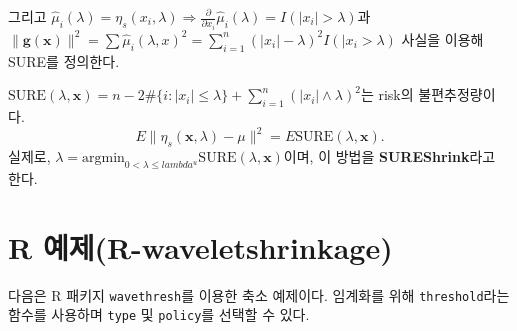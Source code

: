 \documentclass[b5paper,]{scrbook}
\makeatletter
\newenvironment{Shaded}{\begin{snugshade}}{\end{snugshade}}
\newcommand{\DataTypeTok}[1]{\textcolor[rgb]{0.13,0.29,0.53}{#1}}
\newcommand{\DecValTok}[1]{\textcolor[rgb]{0.00,0.00,0.81}{#1}}
\newcommand{\FloatTok}[1]{\textcolor[rgb]{0.00,0.00,0.81}{#1}}
\newcommand{\KeywordTok}[1]{\textcolor[rgb]{0.13,0.29,0.53}{\textbf{#1}}}
\newcommand{\NormalTok}[1]{#1}
\newcommand{\OperatorTok}[1]{\textcolor[rgb]{0.81,0.36,0.00}{\textbf{#1}}}
\newcommand{\StringTok}[1]{\textcolor[rgb]{0.31,0.60,0.02}{#1}}
\theoremstyle{plain}
\theoremstyle{definition}
\numberwithin{equation}{section}
\newenvironment{kframe}{%
\medskip{}
\setlength{\fboxsep}{.8em}
 \def\at@end@of@kframe{}%
 \ifinner\ifhmode%
  \def\at@end@of@kframe{\end{minipage}}%
  \begin{minipage}{\columnwidth}%
 \fi\fi%
 \def\FrameCommand##1{\hskip\@totalleftmargin \hskip-\fboxsep
 \colorbox{shadecolor}{##1}\hskip-\fboxsep
     \hskip-\linewidth \hskip-\@totalleftmargin \hskip\columnwidth}%
 \MakeFramed {\advance\hsize-\width
   \@totalleftmargin\z@ \linewidth\hsize
   \@setminipage}}%
 {\par\unskip\endMakeFramed%
 \at@end@of@kframe}
\renewenvironment{Shaded}{\begin{kframe}}{\end{kframe}}
\let\BeginKnitrBlock\begin \let\EndKnitrBlock\end
\makeatother
\begin{document}
그리고 \(\hat{\mu}_{i}(\lambda)=\eta_{s}(x_{i},\lambda) \Rightarrow \frac{\partial}{\partial x_{i}}\hat{\mu}_{i}(\lambda)=I( |x_{i}|>\lambda)\)과 \(\| \mathbf{g(x)} \|^{2}=\sum \hat{\mu}_{i}(\lambda, x)^{2}=\sum_{i=1}^{n}(|x_{i}|-\lambda)^{2}I(|x_{i}>\lambda)\) 사실을 이용해 SURE를 정의한다.

\BeginKnitrBlock{theorem}[SURE]
\protect\hypertarget{thm:unnamed-chunk-311}{}{\label{thm:unnamed-chunk-311} {} }\(\text{SURE}(\lambda,\mathbf{x})=n-2\#\{ i: |x_{i}| \leq \lambda \} + \sum_{i=1}^{n}(|x_{i}| \wedge \lambda)^{2}\)는 risk의 불편추정량이다.
\[E \| \eta_{s}(\mathbf{x},\lambda)-\mu \|^{2}=E\text{SURE}(\lambda, \mathbf{x}).\]
실제로, \(\lambda=\text{argmin}_{0<\lambda \leq lambda^{u}}\text{SURE}(\lambda,\mathbf{x})\)이며, 이 방법을 \textbf{SUREShrink}라고 한다.
\EndKnitrBlock{theorem}

\hypertarget{r-r-waveletshrinkage}{%
\section{R 예제(R-waveletshrinkage)}\label{r-r-waveletshrinkage}}

다음은 R 패키지 \texttt{wavethresh}를 이용한 축소 예제이다. 임계화를 위해 \texttt{threshold}라는 함수를 사용하며 \texttt{type} 및 \texttt{policy}를 선택할 수 있다.

\begin{Shaded}
\end{Shaded}
\end{document}
